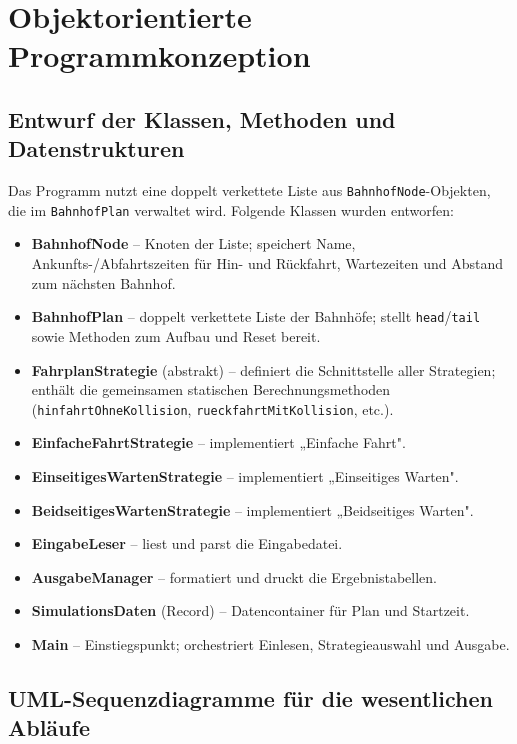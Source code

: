 \documentclass[12pt,a4paper]{article}
\begin{document}
\section{Objektorientierte Programmkonzeption}

\subsection{Entwurf der Klassen, Methoden und Datenstrukturen}

Das Programm nutzt eine doppelt verkettete Liste aus \texttt{BahnhofNode}-Objekten,
die im \texttt{BahnhofPlan} verwaltet wird. Folgende Klassen wurden entworfen:

\begin{itemize}
  \item \textbf{BahnhofNode} -- Knoten der Liste; speichert Name, Ankunfts-/Abfahrtszeiten
        für Hin- und Rückfahrt, Wartezeiten und Abstand zum nächsten Bahnhof.
  \item \textbf{BahnhofPlan} -- doppelt verkettete Liste der Bahnhöfe; stellt
        \texttt{head}/\texttt{tail} sowie Methoden zum Aufbau und Reset bereit.
  \item \textbf{FahrplanStrategie} (abstrakt) -- definiert die Schnittstelle aller
        Strategien; enthält die gemeinsamen statischen Berechnungsmethoden
        (\texttt{hinfahrtOhneKollision}, \texttt{rueckfahrtMitKollision}, etc.).
  \item \textbf{EinfacheFahrtStrategie} -- implementiert „Einfache Fahrt".
  \item \textbf{EinseitigesWartenStrategie} -- implementiert „Einseitiges Warten".
  \item \textbf{BeidseitigesWartenStrategie} -- implementiert „Beidseitiges Warten".
  \item \textbf{EingabeLeser} -- liest und parst die Eingabedatei.
  \item \textbf{AusgabeManager} -- formatiert und druckt die Ergebnistabellen.
  \item \textbf{SimulationsDaten} (Record) -- Datencontainer für Plan und Startzeit.
  \item \textbf{Main} -- Einstiegspunkt; orchestriert Einlesen, Strategieauswahl und Ausgabe.
\end{itemize}

\subsection{UML-Sequenzdiagramme für die wesentlichen Abläufe}
\end{document}
